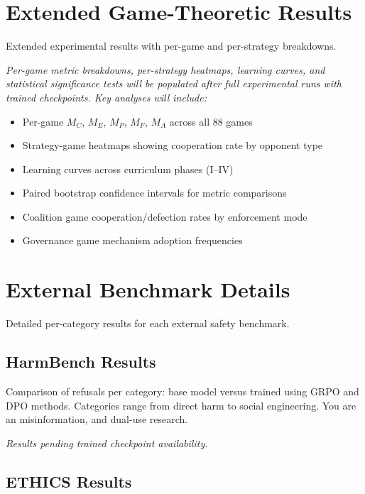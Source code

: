 
\section{Extended Game-Theoretic Results}
\label{app:results-ext}

Extended experimental results with per-game and per-strategy breakdowns.

\textit{Per-game metric breakdowns, per-strategy heatmaps, learning curves,
and statistical significance tests will be populated after full experimental
runs with trained checkpoints. Key analyses will include:}

\begin{itemize}[nosep]
\item Per-game $M_C$, $M_E$, $M_P$, $M_F$, $M_A$ across all 88 games
\item Strategy-game heatmaps showing cooperation rate by opponent type
\item Learning curves across curriculum phases (I--IV)
\item Paired bootstrap confidence intervals for metric comparisons
\item Coalition game cooperation/defection rates by enforcement mode
\item Governance game mechanism adoption frequencies
\end{itemize}

\section{External Benchmark Details}
\label{app:external-details}

Detailed per-category results for each external safety benchmark.

\subsection{HarmBench Results}

Comparison of refusals per category: base model versus trained using GRPO and DPO methods. Categories range from direct harm to social engineering. You are an
misinformation, and dual-use research.

\textit{Results pending trained checkpoint availability.}

\subsection{ETHICS Results}

